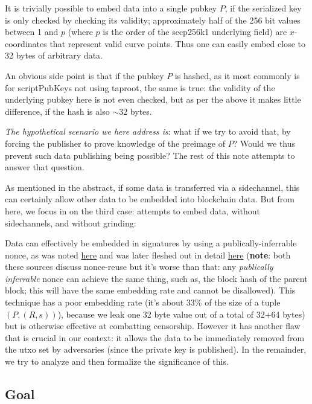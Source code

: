 \documentclass[10pt,a4paper]{article}
\theoremstyle{definition}   %
\theoremstyle{remark}       %
\begin{document}
It is trivially possible to embed data into a single pubkey $P$, if the serialized key is only checked by checking its validity; approximately half of the 256 bit values between 1 and $p$ (where $p$ is the order of the secp256k1 underlying field) are $x$-coordinates that represent valid curve points. Thus one can easily embed close to 32 bytes of arbitrary data.

An obvious side point is that if the pubkey $P$ is hashed, as it most commonly is for scriptPubKeys not using taproot, the same is true: the validity of the underlying pubkey here is not even checked, but as per the above it makes little difference, if the hash is also $\sim 32$ bytes.

\vskip 0.2in

\emph{The hypothetical scenario we here address is}: what if we try to avoid that, by forcing the publisher to prove knowledge of the preimage of $P$? Would we thus prevent such data publishing being possible? The rest of this note attempts to answer that question.

As mentioned in the abstract, if some data is transferred via a sidechannel, this can certainly allow other data to be embedded into blockchain data. But from here, we focus in on the third case: attempts to embed data, without sidechannels, and without grinding:

\vskip 0.2in

Data can effectively be embedded in signatures by using a publically-inferrable nonce, as was noted \href{https://groups.google.com/g/bitcoindev/c/d6ZO7gXGYbQ/m/Y8BfxMVxAAAJ}{here} and was later fleshed out in detail \href{https://blog.bitmex.com/the-unstoppable-jpg-in-private-keys/}{here} (\textbf{note}: both these sources discuss nonce-reuse but it's worse than that: any \emph{publically inferrable} nonce can achieve the same thing, such as, the block hash of the parent block; this will have the same embedding rate and cannot be disallowed). This technique has a poor embedding rate (it's about 33\% of the size of a tuple $(P, (R, s))$), because we leak one 32 byte value out of a total of 32+64 bytes) but is otherwise effective at combatting censorship. However it has another flaw that is crucial in our context: it allows the data to be immediately removed from the utxo set by adversaries (since the private key is published). In the remainder, we try to analyze and then formalize the significance of this.

\subsection{Goal}
\end{document}
